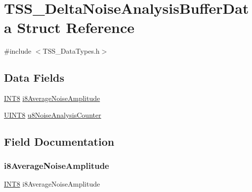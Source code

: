 \hypertarget{struct_t_s_s___delta_noise_analysis_buffer_data}{}\section{T\+S\+S\+\_\+\+Delta\+Noise\+Analysis\+Buffer\+Data Struct Reference}
\label{struct_t_s_s___delta_noise_analysis_buffer_data}


{\ttfamily \#include $<$T\+S\+S\+\_\+\+Data\+Types.\+h$>$}

\subsection*{Data Fields}
\begin{DoxyCompactItemize}
\item 
\hyperlink{_t_s_s___data_types_8h_a7ebe70ceca856797319175e30bcf003d}{I\+N\+T8} \hyperlink{struct_t_s_s___delta_noise_analysis_buffer_data_a492c3a72d9e89daaf9ee3b4a363cea9a}{i8\+Average\+Noise\+Amplitude}
\item 
\hyperlink{_t_s_s___data_types_8h_ab27e9918b538ce9d8ca692479b375b6a}{U\+I\+N\+T8} \hyperlink{struct_t_s_s___delta_noise_analysis_buffer_data_a25b826c93de5cfbe05bd4efa3724e7d1}{u8\+Noise\+Analysis\+Counter}
\end{DoxyCompactItemize}


\subsection{Field Documentation}
\mbox{\label{struct_t_s_s___delta_noise_analysis_buffer_data_a492c3a72d9e89daaf9ee3b4a363cea9a}} 
\subsubsection{\texorpdfstring{i8\+Average\+Noise\+Amplitude}{i8AverageNoiseAmplitude}}
{\footnotesize\ttfamily \hyperlink{_t_s_s___data_types_8h_a7ebe70ceca856797319175e30bcf003d}{I\+N\+T8} i8\+Average\+Noise\+Amplitude}

